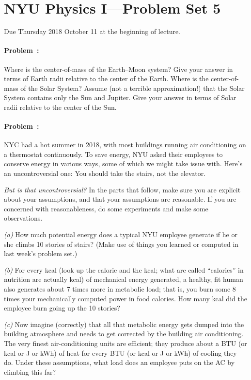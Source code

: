 \documentclass[12pt]{article}
\begin{document}
\section*{NYU Physics I---Problem Set 5}

Due Thursday 2018 October 11 at the beginning of lecture.

\paragraph{Problem~\theproblem:}%
Where is the center-of-mass of the Earth--Moon system? Give your
answer in terms of Earth radii relative to the center of the
Earth. Where is the center-of-mass of the Solar System? Assume (not a
terrible approximation!) that the Solar System contains only the Sun
and Jupiter. Give your answer in terms of Solar radii relative to the
center of the Sun.

\paragraph{Problem~\theproblem:}%
NYC had a hot summer in 2018, with most buildings running air
conditioning on a thermostat continuously. To save energy, NYU asked
their employees to conserve energy in various ways, some of which we
might take issue with. Here's an uncontroversial one: You should take
the stairs, not the elevator.

\emph{But is that uncontroversial?}  In the parts that follow, make
sure you are explicit about your assumptions, and that your
assumptions are reasonable. If you are concerned with reasonableness,
do some experiments and make some observations.

\textsl{(a)} How much potential energy does a typical NYU employee
generate if he or she climbs 10 stories of stairs? (Make use of things
you learned or computed in last week's problem set.)

\textsl{(b)} For every kcal (look up the calorie and the kcal; what
are called ``calories'' in nutrition are actually kcal) of mechanical
energy generated, a healthy, fit human also generates about 7 times
more in metabolic load; that is, you burn some 8 times your
mechanically computed power in food calories. How many kcal did the
employee burn going up the 10 stories?

\textsl{(c)} Now imagine (correctly) that all that metabolic energy
gets dumped into the building atmosphere and needs to get corrected by
the building air conditioning. The very finest air-conditioning units are
efficient; they produce about a BTU (or kcal or J or kWh) of heat
for every BTU (or kcal or J or kWh) of cooling they do. Under these
assumptions, what load does an employee puts on the AC by climbing this far?
\end{document}
